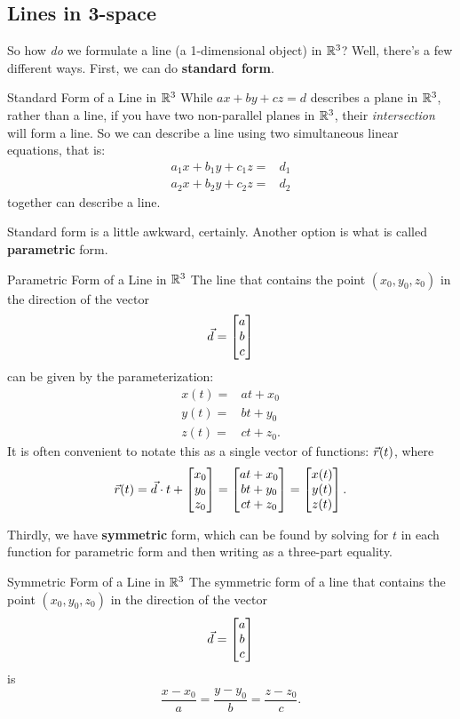 
\subsection{Lines in 3-space}

So how \textit{do} we formulate a line (a 1-dimensional object) in $\mathbb{R}^3$? Well, there's a few different ways. First, we can do \textbf{standard form}.

\begin{definition}{Standard Form of a Line in $\mathbb{R}^3$}
While $ax+by+cz=d$ describes a plane in $\mathbb{R}^3$, rather than a line, if you have two non-parallel planes in $\mathbb{R}^3$, their \textit{intersection} will form a line. So we can describe a line using two simultaneous linear equations, that is:
\begin{align*}
a_1x+b_1y+c_1z=&d_1\\
a_2x+b_2y+c_2z=&d_2
\end{align*}
together can describe a line.
\end{definition}

Standard form is a little awkward, certainly. Another option is what is called \textbf{parametric} form.

\begin{definition}{Parametric Form of a Line in $\mathbb{R}^3$}
The line that contains the point $(x_0,y_0,z_0)$ in the direction of the vector $$\vec{d}=\begin{bmatrix}a\\b\\c\end{bmatrix} $$ can be given by the parameterization:
\begin{align*}
x(t)=&at+x_0\\
y(t)=&bt+y_0\\
z(t)=&ct+z_0.
\end{align*}
It is often convenient to notate this as a single vector of functions: $\vec{r}(t)$, where $$\vec{r}(t)=\vec{d}\cdot t+\begin{bmatrix}x_0\\y_0\\z_0\end{bmatrix}=\begin{bmatrix}at+x_0\\bt+y_0\\ct+z_0\end{bmatrix}=\begin{bmatrix}x(t)\\y(t)\\z(t)\end{bmatrix}.$$
\end{definition}

Thirdly, we have \textbf{symmetric} form, which can be found by solving for $t$ in each function for parametric form and then writing as a three-part equality.

\begin{definition}{Symmetric Form of a Line in $\mathbb{R}^3$}
The symmetric form of a line that contains the point $(x_0,y_0,z_0)$ in the direction of the vector $$\vec{d}=\begin{bmatrix}a\\b\\c\end{bmatrix} $$ is $$\frac{x-x_0}{a}=\frac{y-y_0}{b}=\frac{z-z_0}{c}. $$
\end{definition}

